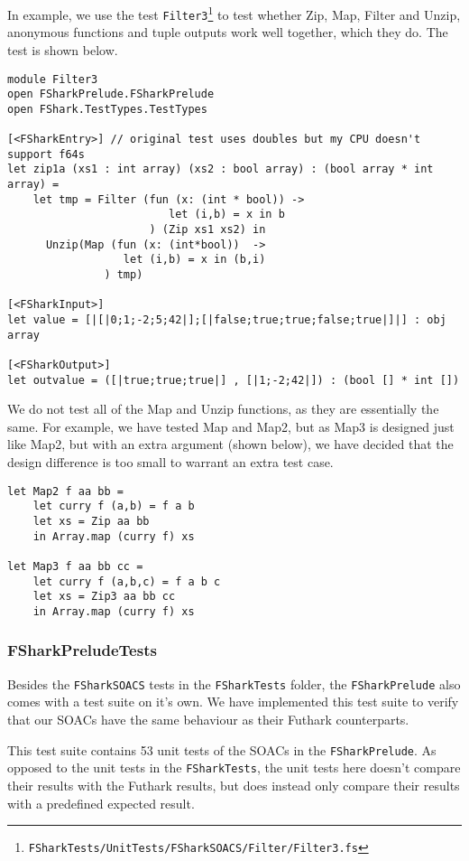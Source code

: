 In example, we use the test \texttt{Filter3}\footnote{\texttt{FSharkTests/UnitTests/FSharkSOACS/Filter/Filter3.fs}} to test whether
Zip, Map, Filter and Unzip, anonymous functions and tuple outputs work well
together, which they do. The test is shown below.
\begin{verbatim}
module Filter3
open FSharkPrelude.FSharkPrelude
open FShark.TestTypes.TestTypes

[<FSharkEntry>] // original test uses doubles but my CPU doesn't support f64s
let zip1a (xs1 : int array) (xs2 : bool array) : (bool array * int array) =
    let tmp = Filter (fun (x: (int * bool)) ->
                         let (i,b) = x in b
                      ) (Zip xs1 xs2) in
      Unzip(Map (fun (x: (int*bool))  ->
                  let (i,b) = x in (b,i)
               ) tmp)

[<FSharkInput>]
let value = [|[|0;1;-2;5;42|];[|false;true;true;false;true|]|] : obj array

[<FSharkOutput>]
let outvalue = ([|true;true;true|] , [|1;-2;42|]) : (bool [] * int [])
\end{verbatim}

We do not test all of the Map and Unzip functions, as they are essentially
the same.
For example, we have tested Map and Map2, but as Map3 is designed just
like Map2, but with an extra argument (shown below), we have decided that the
design difference is too small to warrant an extra test case.

\begin{verbatim}
let Map2 f aa bb =
    let curry f (a,b) = f a b 
    let xs = Zip aa bb
    in Array.map (curry f) xs

let Map3 f aa bb cc =
    let curry f (a,b,c) = f a b c
    let xs = Zip3 aa bb cc
    in Array.map (curry f) xs
\end{verbatim}

\subsubsection{FSharkPreludeTests}
Besides the \texttt{FSharkSOACS} tests in the \texttt{FSharkTests} folder, the
\texttt{FSharkPrelude} also comes with a test suite on it's own.
We have implemented this test suite to verify that our \fshark{} SOACs have the
same behaviour as their Futhark counterparts.

This test suite contains 53 unit tests of the SOACs in the
\texttt{FSharkPrelude}.
As opposed to the unit tests in the \texttt{FSharkTests}, the unit tests here
doesn't compare their results with the Futhark results, but does instead only
compare their results with a predefined expected result.

